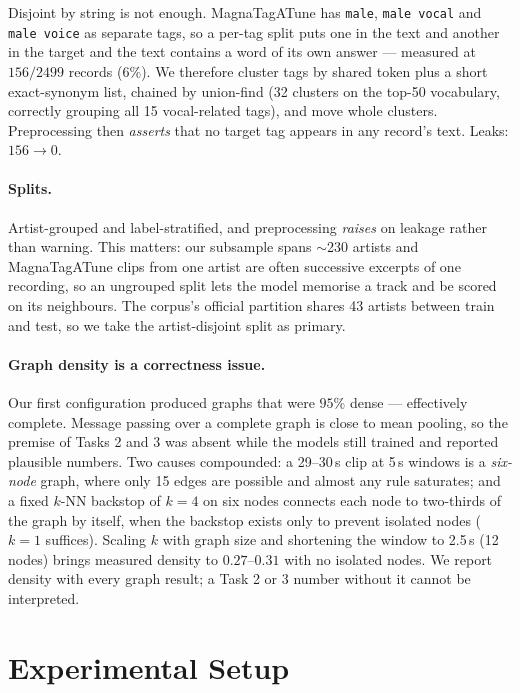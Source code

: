 \documentclass[10pt]{article}
\begin{document}
Disjoint by string is not enough. MagnaTagATune has \texttt{male},
\texttt{male vocal} and \texttt{male voice} as separate tags, so a per-tag split
puts one in the text and another in the target and the text contains a word of
its own answer --- measured at $156/2499$ records ($6\%$). We therefore cluster
tags by shared token plus a short exact-synonym list, chained by union-find (32
clusters on the top-50 vocabulary, correctly grouping all 15 vocal-related
tags), and move whole clusters. Preprocessing then \emph{asserts} that no target
tag appears in any record's text. Leaks: $156 \rightarrow 0$.

\paragraph{Splits.} Artist-grouped and label-stratified, and preprocessing
\emph{raises} on leakage rather than warning. This matters: our subsample spans
$\sim$230 artists and MagnaTagATune clips from one artist are often successive
excerpts of one recording, so an ungrouped split lets the model memorise a track
and be scored on its neighbours. The corpus's official partition shares 43
artists between train and test, so we take the artist-disjoint split as primary.

\paragraph{Graph density is a correctness issue.}
\label{sec:density}
Our first configuration produced graphs that were $95\%$ dense --- effectively
complete. Message passing over a complete graph is close to mean pooling, so the
premise of Tasks 2 and 3 was absent while the models still trained and reported
plausible numbers. Two causes compounded: a 29--30\,s clip at 5\,s windows is a
\emph{six-node} graph, where only 15 edges are possible and almost any rule
saturates; and a fixed $k$-NN backstop of $k{=}4$ on six nodes connects each node
to two-thirds of the graph by itself, when the backstop exists only to prevent
isolated nodes ($k{=}1$ suffices). Scaling $k$ with graph size and shortening
the window to 2.5\,s (12 nodes) brings measured density to $0.27$--$0.31$ with no
isolated nodes. We report density with every graph result; a Task 2 or 3 number
without it cannot be interpreted.

\vspace{-0.3em}
\section{Experimental Setup}
\label{sec:setup}
\end{document}
